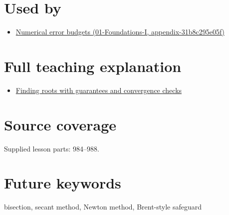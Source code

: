 \section{Used by}\label{appendix-f63eb850796d-used-by}

\begin{itemize}
\tightlist
\item
  \href{../01-Foundations-I/main.pdf\#nameddest=appendix-31b8c295e05f}{Numerical error budgets (01-Foundations-I, appendix-31b8c295e05f)}
\end{itemize}

\section{Full teaching explanation}\label{appendix-f63eb850796d-full-teaching-explanation}

\begin{itemize}
\tightlist
\item
  \href{Continuous\%20Notes/Computing\%20Foundations\%20-\%20From\%20Bits\%20to\%20C++\%20and\%20Systems\%20APIs\#Finding\%20roots\%20with\%20guarantees\%20and\%20convergence\%20checks}{Finding roots with guarantees and convergence checks}
\end{itemize}

\section{Source coverage}\label{appendix-f63eb850796d-source-coverage}

Supplied lesson parts: 984--988.

\section{Future keywords}\label{appendix-f63eb850796d-future-keywords}

bisection, secant method, Newton method, Brent-style safeguard
